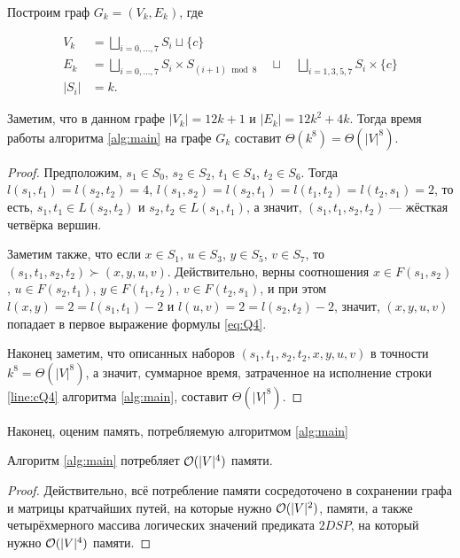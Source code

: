 \begin{theorem}
Построим граф $G_k = (V_k, E_k)$, где 

\begin{align}
V_k &= \bigsqcup\limits_{i = 0,\ldots,7} S_i \sqcup \{c\} \\
E_k &= \bigsqcup\limits_{i = 0,\ldots,7} S_i \times S_{(i+1) \bmod 8} \quad\sqcup\quad \bigsqcup\limits_{i=1,3,5,7} S_i \times \{c\} \\
|S_i| &= k.
\end{align}

Заметим, что в данном графе $|V_k| = 12k + 1$ и $|E_k| = 12k^2 + 4k$. Тогда время работы алгоритма \ref{alg:main} на графе $G_k$ составит $\Theta(k^8) = \Theta(|V|^8)$.

\end{theorem}
\begin{proof}
Предположим, $s_1 \in S_0$, $s_2 \in S_2$, $t_1 \in S_4$, $t_2 \in S_6$. Тогда $l(s_1, t_1) = l(s_2, t_2) = 4$, $l(s_1, s_2) = l(s_2, t_1) = l(t_1, t_2) = l(t_2, s_1) = 2$, то есть, $s_1, t_1 \in L(s_2, t_2)$ и $s_2, t_2 \in L(s_1, t_1)$, а значит, $(s_1, t_1, s_2, t_2)$ --- жёсткая четвёрка вершин.

Заметим также, что если $x \in S_1$, $u \in S_3$, $y \in S_5$, $v \in S_7$, то $(s_1, t_1, s_2, t_2) \succ (x, y, u, v)$. Действительно, верны соотношения $x \in F(s_1, s_2)$, $u \in F(s_2, t_1)$, $y \in F(t_1, t_2)$, $v \in F(t_2, s_1)$, и при этом $l(x, y) = 2 = l(s_1, t_1) - 2$ и $l(u, v) = 2 = l(s_2, t_2) - 2$, значит, $(x, y, u, v)$ попадает в первое выражение формулы \ref{eq:Q4}.

Наконец заметим, что описанных наборов $(s_1, t_1, s_2, t_2, x, y, u, v)$ в точности $k^8 = \Theta(|V|^8)$, а значит, суммарное время, затраченное на исполнение строки \ref{line:cQ4} алгоритма \ref{alg:main}, составит $\Theta(|V|^8)$.
\end{proof}

Наконец, оценим память, потребляемую алгоритмом \ref{alg:main}
\begin{theorem}
Алгоритм \ref{alg:main} потребляет $\mathcal{O}(|V|^4)$ памяти.
\end{theorem}
\begin{proof}
Действительно, всё потребление памяти сосредоточено в сохранении графа и матрицы кратчайших путей, на которые нужно $\mathcal{O}(|V|^2)$, памяти, а также четырёхмерного массива логических значений предиката $2DSP$, на который нужно $\mathcal{O}(|V|^4)$ памяти.
\end{proof}
